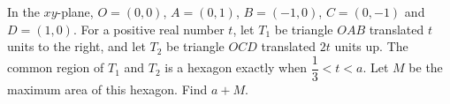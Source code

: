 In the \(xy\)-plane, \(O=(0,0)\), \(A=(0,1)\), \(B=(-1,0)\), \(C=(0,-1)\) and \(D=(1,0)\). For a positive real number \(t\), let \(T_1\) be triangle \(OAB\) translated \(t\) units to the right, and let \(T_2\) be triangle \(OCD\) translated \(2t\) units up. The common region of \(T_1\) and \(T_2\) is a hexagon exactly when \(\dfrac{1}{3}<t<a\). Let \(M\) be the maximum area of this hexagon. Find \(a+M\).
